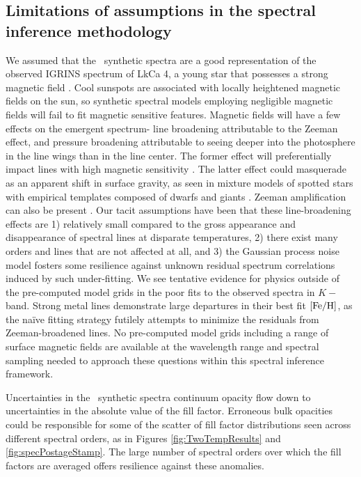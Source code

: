 \documentclass[twocolumn]{emulateapj}%
\begin{document}



\subsection{Limitations of assumptions in the spectral inference methodology}

We assumed that the \PHOENIX\ synthetic spectra are a good representation of the observed IGRINS spectrum of LkCa 4, a young star that possesses a strong magnetic field \citep{donati14}.  Cool sunspots are associated with locally heightened magnetic fields on the sun, so synthetic spectral models employing negligible magnetic fields will fail to fit magnetic sensitive features.  Magnetic fields will have a few effects on the emergent spectrum- line broadening attributable to the Zeeman effect, and pressure broadening attributable to seeing deeper into the photosphere in the line wings than in the line center.  The former effect will preferentially impact lines with high magnetic sensitivity \citep[\emph{e.g.}][]{johnskrull99,deen13}.  The latter effect could masquerade as an apparent shift in surface gravity, as seen in mixture models of spotted stars with empirical templates composed of dwarfs and giants \citep{oneal96}.  Zeeman amplification can also be present \citep{basri92}. Our tacit assumptions have been that these line-broadening effects are 1) relatively small compared to the gross appearance and disappearance of spectral lines at disparate temperatures, 2) there exist many orders and lines that are not affected at all, and 3) the Gaussian process noise model fosters some resilience against unknown residual spectrum correlations induced by such under-fitting.  We see tentative evidence for physics outside of the pre-computed model grids in the poor fits to the observed spectra in $K-$band.  Strong metal lines demonstrate large departures in their best fit $[{\rm Fe}/{\rm H}]$, as the na\"{i}ve fitting strategy futilely attempts to minimize the residuals from Zeeman-broadened lines.  No pre-computed model grids including a range of surface magnetic fields are available at the wavelength range and spectral sampling needed to approach these questions within this spectral inference framework.

Uncertainties in the \PHOENIX\ synthetic spectra continuum opacity flow down to uncertainties in the absolute value of the fill factor.  Erroneous bulk opacities could be responsible for some of the scatter of fill factor distributions seen across different spectral orders, as in Figures \ref{fig:TwoTempResults} and \ref{fig:specPostageStamp}.  The large number of spectral orders over which the fill factors are averaged offers resilience against these anomalies.
\end{document}
